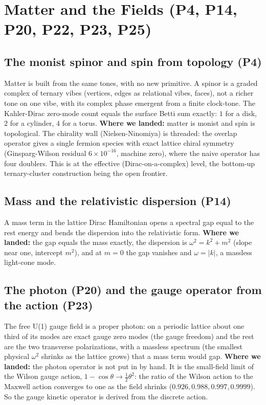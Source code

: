 \section{Matter and the Fields (P4, P14, P20, P22, P23, P25)}
\label{sec:matter}

\subsection{The monist spinor and spin from topology (P4)}

Matter is built from the same tones, with no new primitive. A spinor is a graded
complex of ternary vibes (vertices, edges as relational vibes, faces), not a richer
tone on one vibe, with its complex phase emergent from a finite clock-tone. The
Kahler-Dirac zero-mode count equals the surface Betti sum exactly: $1$ for a disk, $2$
for a cylinder, $4$ for a torus. \textbf{Where we landed:} matter is monist and spin is
topological. The chirality wall (Nielsen-Ninomiya) is threaded: the overlap operator
gives a single fermion species with exact lattice chiral symmetry (Ginsparg-Wilson
residual $6\times10^{-16}$, machine zero), where the naive operator has four doublers.
This is at the effective (Dirac-on-a-complex) level, the bottom-up ternary-cluster
construction being the open frontier.

\subsection{Mass and the relativistic dispersion (P14)}

A mass term in the lattice Dirac Hamiltonian opens a spectral gap equal to the rest
energy and bends the dispersion into the relativistic form. \textbf{Where we landed:}
the gap equals the mass exactly, the dispersion is $\omega^2 = k^2 + m^2$ (slope near
one, intercept $m^2$), and at $m=0$ the gap vanishes and $\omega = |k|$, a massless
light-cone mode.

\subsection{The photon (P20) and the gauge operator from the action (P23)}

The free U(1) gauge field is a proper photon: on a periodic lattice about one third of
its modes are exact gauge zero modes (the gauge freedom) and the rest are the two
transverse polarizations, with a massless spectrum (the smallest physical $\omega^2$
shrinks as the lattice grows) that a mass term would gap. \textbf{Where we landed:} the
photon operator is not put in by hand. It is the small-field limit of the Wilson gauge
action, $1 - \cos\theta \to \tfrac12\theta^2$: the ratio of the Wilson action to the
Maxwell action converges to one as the field shrinks ($0.926, 0.988, 0.997, 0.9999$).
So the gauge kinetic operator is derived from the discrete action.

